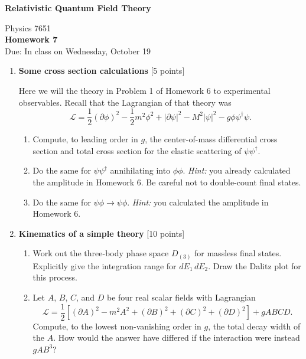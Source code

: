 \documentclass[12pt]{article}
\begin{document}
\vspace*{-1cm}
\begin{center}
{\LARGE \bf Relativistic Quantum Field Theory}

\vspace*{0.5cm}
{\Large Physics 7651} \\
\vspace*{0.5cm}
{\Large {\bf Homework 7}\\
\vspace*{0.5cm}
Due: In class on Wednesday, October 19}
\end{center}
\begin{enumerate}



\item {\bf Some cross section calculations} [5 points]

Here we will the theory in Problem 1 of Homework 6 to experimental observables. Recall that the Lagrangian of that theory was
$$
\mathcal L = \frac 12 \left(\partial \phi\right)^2  - \frac 12 m^2\phi^2 + \left|\partial \psi\right|^2 - M^2 |\psi|^2 - g\phi\psi^\dagger\psi.
$$
\begin{enumerate}
\item Compute, to leading order in $g$, the center-of-mass differential cross section and total cross section for the elastic scattering of $\psi\psi^\dag$.
\item Do the same for $\psi\psi^\dag$ annihilating into $\phi\phi$. \textit{Hint:} you already calculated the amplitude in Homework 6. Be careful not to double-count final states.
\item Do the same for $\psi\phi \to \psi \phi$. \textit{Hint:} you calculated the amplitude in  Homework 6.
\end{enumerate}

\vspace{1em}

\item {\bf Kinematics of a simple theory} [10 points]

\begin{enumerate}
\item Work out the three-body phase space $D_{(3)}$ for massless final states. Explicitly give the integration range for $dE_1\, dE_2$. Draw the Dalitz plot for this process.

\item Let $A$, $B$, $C$, and $D$ be four real scalar fields with Lagrangian
$$\mathcal L = \frac 12 \left[
(\partial A)^2 - m^2 A^2
+ (\partial B)^2
+ (\partial C)^2
+ (\partial D)^2
\right]
+ g ABCD.
$$
Compute, to the lowest non-vanishing order in $g$, the total decay width of the $A$. How would the answer have differed if the interaction were instead $gAB^3$?


\end{enumerate}
\end{enumerate}
\end{document}
